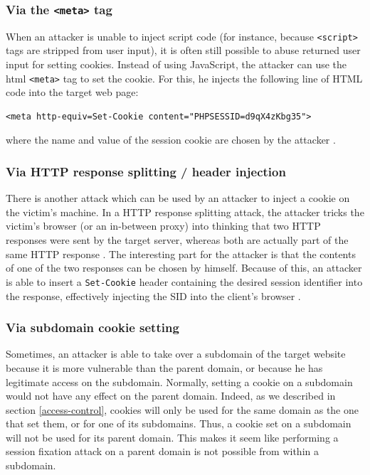 \subsubsection{Via the \texttt{<meta>} tag}

When an attacker is unable to inject script code (for instance, because \texttt{<script>} tags are stripped from user input), it is often still possible to abuse returned user input for setting cookies. Instead of using JavaScript, the attacker can use the \gls{html} \texttt{<meta>} tag to set the cookie. For this, he injects the following line of HTML code into the target web page:
\begin{lstlisting}
<meta http-equiv=Set-Cookie content="PHPSESSID=d9qX4zKbg35">
\end{lstlisting}
where the name and value of the session cookie are chosen by the attacker \cite{Kolsek2002}.

\subsubsection{Via HTTP response splitting / header injection}

There is another attack which can be used by an attacker to inject a cookie on the victim's machine. In a HTTP response splitting attack, the attacker tricks the victim's browser (or an in-between proxy) into thinking that two HTTP responses were sent by the target server, whereas both are actually part of the same HTTP response \cite{Klein2004}. The interesting part for the attacker is that the contents of one of the two responses can be chosen by himself. Because of this, an attacker is able to insert a \texttt{Set-Cookie} header containing the desired session identifier into the response, effectively injecting the SID into the client's browser \cite{Johns2011}.

\subsubsection{Via subdomain cookie setting}\label{subdomain-setting}

Sometimes, an attacker is able to take over a subdomain of the target website because it is more vulnerable than the parent domain, or because he has legitimate access on the subdomain. Normally, setting a cookie on a subdomain would not have any effect on the parent domain. Indeed, as we described in section \ref{access-control}, cookies will only be used for the same domain as the one that set them, or for one of its subdomains. Thus, a cookie set on a subdomain will not be used for its parent domain. This makes it seem like performing a session fixation attack on a parent domain is not possible from within a subdomain.

